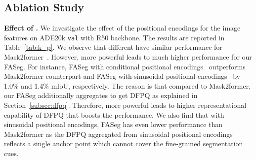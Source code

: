 \begin{table}[t!]
\centering
\caption{Performance comparisons between DFPQ and other positional queries variants on ADE20K \texttt{val}~\cite{zhou2017scene} with 150 categories.}
\vspace{-0.5em}
\label{tab:abl_positional}
\vspace{-1em}
\end{table}

\subsection{Ablation Study}\label{subsec:abl}

\noindent\textbf{Effect of .} We investigate the effect of the positional encodings  for the image features on ADE20k \texttt{val} with R50 backbone. The results are reported in Table~\ref{tab:k_p}. We observe that different  have similar performance for Mask2former~\cite{cheng2021masked}. However, more powerful  leads to much higher performance for our FASeg. For instance, FASeg with conditional positional encodings~\cite{chu2021conditional} outperforms Mask2former counterpart and FASeg with sinusoidal positional encodings~\cite{carion2020end} by 1.0\% and 1.4\% mIoU, respectively. The reason is that compared to Mask2former, our FASeg additionally aggregates  to get DFPQ as explained in Section~\ref{subsec:dfpq}. Therefore, more powerful  leads to higher representational capability of DFPQ that boosts the performance. We also find that with sinusoidal positional encodings, FASeg has even lower performance than Mask2former as the DFPQ aggregated from sinusoidal positional encodings reflects a single anchor point which cannot cover the fine-grained segmentation cues.

